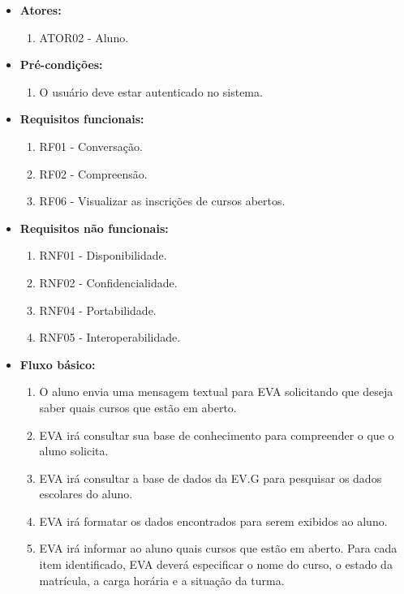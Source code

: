 \begin{itemize}
    \item \textbf{Atores:}
        \begin{enumerate}
            \item ATOR02 - Aluno.
        \end{enumerate}
    \item \textbf{Pré-condições:}
        \begin{enumerate}
            \item O usuário deve estar autenticado no sistema.
        \end{enumerate}
    \item \textbf{Requisitos funcionais:}
        \begin{enumerate}
            \item RF01 - Conversação.
            \item RF02 - Compreensão.
            \item RF06 - Visualizar as inscrições de cursos abertos.
        \end{enumerate}
    \item \textbf{Requisitos não funcionais:}
        \begin{enumerate}
            \item RNF01 - Disponibilidade.
            \item RNF02 - Confidencialidade.
            \item RNF04 - Portabilidade.
            \item RNF05 - Interoperabilidade.
        \end{enumerate}
    \item \textbf{Fluxo básico:}
        \begin{enumerate}
            \item O aluno envia uma mensagem textual para EVA solicitando que deseja saber quais cursos que estão em aberto.
            \item EVA irá consultar sua base de conhecimento para compreender o que o aluno solicita.
            \item EVA irá consultar a base de dados da EV.G para pesquisar os dados escolares do aluno.
            \item EVA irá formatar os dados encontrados para serem exibidos ao aluno.
            \item EVA irá informar ao aluno quais cursos que estão em aberto. Para cada item identificado, EVA deverá especificar o nome do curso, o estado da matrícula, a carga horária e a situação da turma. 
        \end{enumerate}
        

\end{itemize}
